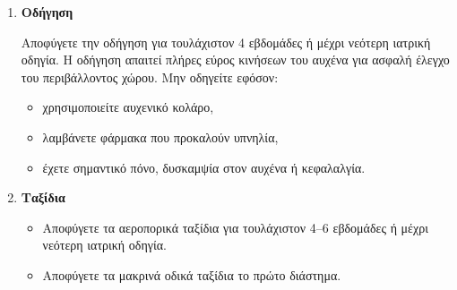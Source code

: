 \documentclass[10pt,greek]{article}
\begin{document}
\begin{enumerate}[label=\arabic*.]
    \begin{itemize}
\item Διατροφή πλούσια σε πρωτεΐνες και φυτικές ίνες, μαλακής σύστασης το πρώτο διάστημα.
\item Επαρκής ενυδάτωση -- τουλάχιστον 1,5--2 λίτρα υγρών ημερησίως.
\item Ενημερώστε τον ιατρό εάν παραμένει δυσκοιλιότητα.
    \end{itemize}
  \item \textbf{Οδήγηση}

Αποφύγετε την οδήγηση για τουλάχιστον 4 εβδομάδες ή μέχρι νεότερη ιατρική οδηγία. Η οδήγηση απαιτεί πλήρες εύρος κινήσεων του αυχένα για ασφαλή έλεγχο του περιβάλλοντος χώρου. Μην οδηγείτε εφόσον:
    \begin{itemize}
\item χρησιμοποιείτε αυχενικό κολάρο,
\item λαμβάνετε φάρμακα που προκαλούν υπνηλία,
\item έχετε σημαντικό πόνο, δυσκαμψία στον αυχένα ή κεφαλαλγία.
    \end{itemize}
  \item \textbf{Ταξίδια}
    \begin{itemize}
\item Αποφύγετε τα αεροπορικά ταξίδια για τουλάχιστον 4--6 εβδομάδες ή μέχρι νεότερη ιατρική οδηγία.
\item Αποφύγετε τα μακρινά οδικά ταξίδια το πρώτο διάστημα.
    \end{itemize}
\end{enumerate}
\end{document}
